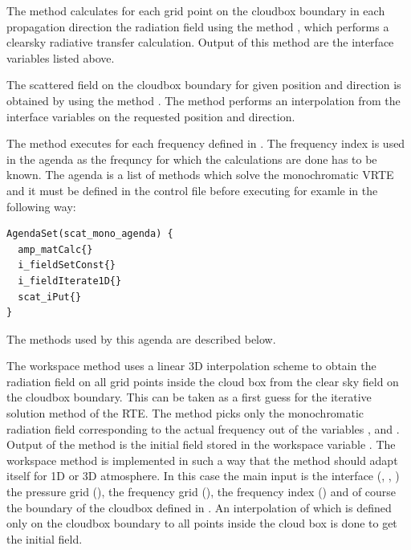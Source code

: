  The method
 calculates for each grid point on the
cloudbox boundary in each propagation direction the radiation field
using the method , which performs a clearsky
radiative transfer calculation.  Output of this method are the
interface variables listed above.

 The scattered field on
the cloudbox boundary for given position and direction is obtained by
using the method . The method performs
an interpolation from the interface variables on the requested
position and direction.


\label{sec:scattering:scat_mono_ag}

The method  executes
 for each frequency defined in
. The frequency index  is
used in the agenda as the frequncy for which the calculations are done
has to be known.  The agenda is a list of methods which solve the
monochromatic VRTE and it must be defined in the control file before
executing  for examle in the following way:

\begin{verbatim}
AgendaSet(scat_mono_agenda) {
  amp_matCalc{}
  i_fieldSetConst{}
  i_fieldIterate1D{}
  scat_iPut{}
}
\end{verbatim}

\noindent
The methods used by this agenda are described below.

 

The workspace method  uses a linear 3D
interpolation scheme to obtain the radiation field on all grid points
inside the cloud box from the clear sky field on the cloudbox
boundary.  This can be taken as a first guess for the iterative
solution method of the RTE.  The method picks only the monochromatic
radiation field corresponding to the actual frequency out of the
variables ,  and
. Output of the method is the initial field
stored in the workspace variable .  The workspace
method  is implemented in such a way
that the method should adapt itself for 1D or 3D atmosphere. In this
case the main input is the interface (,
, ) the pressure grid
(), the frequency grid (), the
frequency index () and of course the
boundary of the cloudbox defined in .  An
interpolation of  which is defined only on the
cloudbox boundary to all points inside the cloud box is
done to get the initial field. \\

